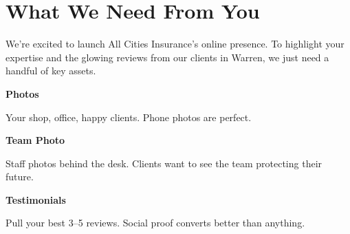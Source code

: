 \documentclass[11pt,letterpaper]{article}
\begin{document}
\vspace{0.2em}

\section*{What We Need From You}

We're excited to launch All Cities Insurance’s online presence. To highlight your expertise and the glowing reviews from our clients in Warren, we just need a handful of key assets.

\vspace{0.12em}

\noindent\begin{minipage}[t]{0.48\textwidth}
\begin{tcolorbox}[colframe=accent-teal, boxrule=1pt, left=0.7em, right=0.7em, top=0.5em, bottom=0.5em, arc=4pt, boxsep=0pt]
{\bfseries\small\color{accent-teal}Photos}

\vspace{0.15em}

{\small Your shop, office, happy clients. Phone photos are perfect.}
\end{tcolorbox}

\vspace{0.1em}

\begin{tcolorbox}[colframe=accent-teal, boxrule=1pt, left=0.7em, right=0.7em, top=0.5em, bottom=0.5em, arc=4pt, boxsep=0pt]
{\bfseries\small\color{accent-teal}Team Photo}

\vspace{0.15em}

{\small Staff photos behind the desk. Clients want to see the team protecting their future.}
\end{tcolorbox}

\vspace{0.1em}

\begin{tcolorbox}[colframe=accent-teal, boxrule=1pt, left=0.7em, right=0.7em, top=0.5em, bottom=0.5em, arc=4pt, boxsep=0pt]
{\bfseries\small\color{accent-teal}Testimonials}

\vspace{0.15em}

{\small Pull your best 3--5 reviews. Social proof converts better than anything.}
\end{tcolorbox}
\end{minipage}
\hfill
\end{document}
